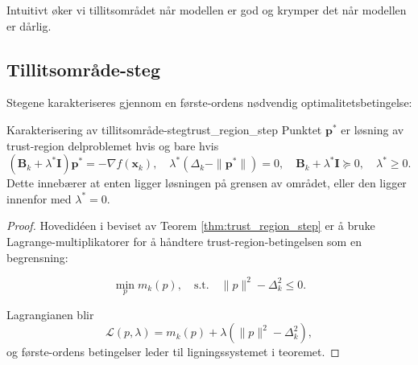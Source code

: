 \begin{algorithm}[H]
	\SetAlgoLined
	\caption{Intuitivt øker vi tillitsområdet når modellen er god og krymper det når modellen er dårlig.}
	\label{alg:trust_region_2}
\end{algorithm}

\subsection{Tillitsområde-steg}
Stegene karakteriseres gjennom en første-ordens nødvendig optimalitetsbetingelse:
\begin{theorem}{Karakterisering av tillitsområde-steg}{trust_region_step}
	Punktet $\symbf{p}^\ast$ er løsning av trust-region delproblemet hvis og bare hvis
	\[
		(\symbf{B}_k + \lambda^\ast \symbf{I})\symbf{p}^\ast = -\nabla f(\symbf{x}_k), \quad \lambda^\ast (\Delta_k - \|\symbf{p}^\ast\|) = 0, \quad \symbf{B}_k + \lambda^\ast \symbf{I} \succeq 0, \quad \lambda^\ast \ge 0.
	\]
	Dette innebærer at enten ligger løsningen på grensen av området, eller den ligger innenfor med $\lambda^\ast = 0$.
\end{theorem}

\begin{proof}{}{}
	Hovedidéen i beviset av Teorem \ref{thm:trust_region_step} er å bruke Lagrange-multiplikatorer for å håndtere trust-region-betingelsen som en begrensning:

\[
	\min_p m_k(p), \quad \text{s.t.} \quad \|p\|^2 - \Delta_k^2 \leq 0.
\]

Lagrangianen blir
\[
	\mathcal{L}(p,\lambda) = m_k(p) + \lambda(\|p\|^2 - \Delta_k^2),
\]
og første-ordens betingelser leder til ligningssystemet i teoremet.
\end{proof}

